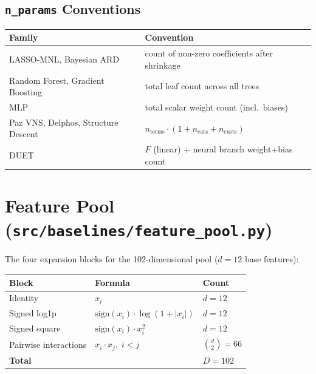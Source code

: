 \documentclass[11pt,a4paper]{article}
\begin{document}
\subsection{\texttt{n\_params} Conventions}

\begin{table}[H]\centering\small
\begin{tabularx}{\textwidth}{lX}
\toprule
Family & Convention \\
\midrule
LASSO-MNL, Bayesian ARD        & count of non-zero coefficients after shrinkage \\
Random Forest, Gradient Boosting & total leaf count across all trees \\
MLP                              & total scalar weight count (incl.\ biases) \\
Paz VNS, Delphos, Structure Descent & $n_{\text{terms}} \cdot (1 + n_{\text{cats}} + n_{\text{custs}})$ \\
DUET                             & $F$ (linear) + neural branch weight+bias count \\
\bottomrule
\end{tabularx}
\end{table}


\section{Feature Pool (\texttt{src/baselines/feature\_pool.py})}
\label{sec:feature-pool}

The four expansion blocks for the 102-dimensional pool ($d = 12$ base features):

\begin{table}[H]\centering
\begin{tabular}{lll}
\toprule
Block & Formula & Count \\
\midrule
Identity            & $x_i$                                       & $d = 12$ \\
Signed log1p        & $\text{sign}(x_i) \cdot \log(1 + |x_i|)$   & $d = 12$ \\
Signed square       & $\text{sign}(x_i) \cdot x_i^2$              & $d = 12$ \\
Pairwise interactions & $x_i \cdot x_j,\; i < j$                  & $\binom{d}{2} = 66$ \\
\midrule
\textbf{Total}      &                                              & $D = 102$ \\
\bottomrule
\end{tabular}
\end{table}
\end{document}
